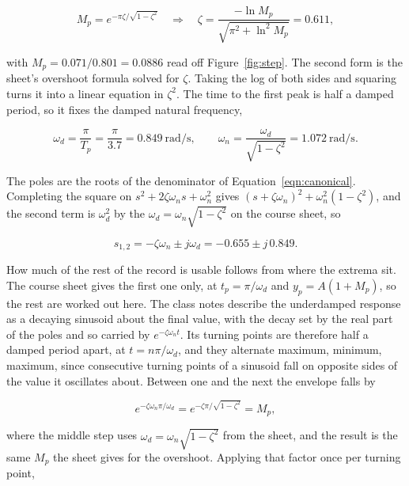 \begin{equation}\label{eqn:zeta}
    M_p = e^{-\pi\zeta/\sqrt{1-\zeta^2}}
    \quad\Longrightarrow\quad
    \zeta = \frac{-\ln M_p}{\sqrt{\pi^2 + \ln^2 M_p}} = 0.611,
\end{equation}

with $M_p = 0.071/0.801 = 0.0886$ read off Figure~\ref{fig:step}. The second form is the
sheet's overshoot formula solved for $\zeta$. Taking the log of both sides and squaring
turns it into a linear equation in $\zeta^2$. The time to the first peak
is half a damped period, so it fixes the damped natural frequency,

\begin{equation}\label{eqn:wd}
    \omega_d = \frac{\pi}{T_p} = \frac{\pi}{3.7} = 0.849~\text{rad/s},
    \qquad
    \omega_n = \frac{\omega_d}{\sqrt{1-\zeta^2}} = 1.072~\text{rad/s}.
\end{equation}

The poles are the roots of the denominator of Equation~\ref{eqn:canonical}. Completing the
square on $s^2 + 2\zeta\omega_n s + \omega_n^2$ gives
$(s + \zeta\omega_n)^2 + \omega_n^2(1 - \zeta^2)$, and the second term is $\omega_d^2$ by the
$\omega_d = \omega_n\sqrt{1-\zeta^2}$ on the course sheet, so

\begin{equation}\label{eqn:poles}
    s_{1,2} = -\zeta\omega_n \pm j\omega_d = -0.655 \pm j\,0.849.
\end{equation}

How much of the rest of the record is usable follows from where the extrema sit. The course
sheet gives the first one only, at $t_p = \pi/\omega_d$ and $y_p = A(1 + M_p)$, so the rest are
worked out here. The class notes describe the underdamped response as a decaying sinusoid about
the final value, with the decay set by the real part of the poles and so carried by
$e^{-\zeta\omega_n t}$. Its turning points are therefore half a damped period apart, at
$t = n\pi/\omega_d$, and they alternate maximum, minimum, maximum, since consecutive turning
points of a sinusoid fall on opposite sides of the value it oscillates about. Between one and
the next the envelope falls by

\begin{equation}\label{eqn:decayfactor}
    e^{-\zeta\omega_n \pi/\omega_d} = e^{-\zeta\pi/\sqrt{1-\zeta^2}} = M_p,
\end{equation}

where the middle step uses $\omega_d = \omega_n\sqrt{1-\zeta^2}$ from the sheet, and the result
is the same $M_p$ the sheet gives for the overshoot. Applying that factor once per turning
point,


